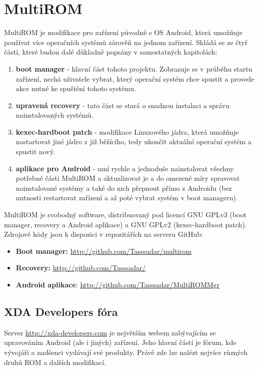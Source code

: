 \documentclass[12pt, a4paper, oneside]{article}
\newcommand{\B}{\textbf} %
\begin{document}
\section{MultiROM}
MultiROM je modifikace pro zařízení původně s OS Android, která umožňuje používat více operačních systémů zárověň na jednom zařízení. Skládá se ze čtyř částí, které budou dalé důkladně popsány v samostatných kapitolách:

\begin{enumerate}
    \item \B{boot manager} - hlavní část tohoto projektu. Zobrazuje se v průběhu startu zařízení, nechá uživatele vybrat, který operační systém chce spustit a provede akce nutné ke spuštění tohoto systému.
    \item \B{upravená recovery} - tato část se stará o snadnou instalaci a správu nainstalovaných systémů.
    \item \B{kexec-hardboot patch} - modifikace Linuxového jádra, která umožňuje nastartovat jiné jádro z již běžícího, tedy ukončit aktuální operační systém a spustit nový.
    \item \B{aplikace pro Android} - umí rychle a jednoduše nainstalovat všechny potřebné části MultiROM a aktualizovat je a do omezené míry spravovat nainstalované systémy a také do nich přepnout přímo z Androidu (bez nutnosti restartovat zařízení a až poté vybrat systém v boot manageru).
\end{enumerate}

MultiROM je svobodný software, distribuovaný pod licencí GNU GPLv3 (boot manager, recovery a Android aplikace) a GNU GPLv2 (kexec-hardboot patch). Zdrojové kódy jsou k dispozici v repozitářích na serveru GitHub:
\begin{itemize}
    \item \B{Boot manager:} \url{http://github.com/Tasssadar/multirom}
    \item \B{Recovery:} \url{http://github.com/Tasssadar/}
    \item \B{Android aplikace}: \url{http://github.com/Tasssadar/MultiROMMgr}
\end{itemize}

\subsection{XDA Developers fóra}
Server \url{http://xda-developers.com} je největším webem zabývajícím se upravováním Android (ale i jiných) zařízení. Jeho hlavní částí je fórum, kde vývojáři a nadšenci vydávají své produkty. Právě zde lze nalézt nejvíce různých druhů ROM a dalších modifikací.
\end{document}
